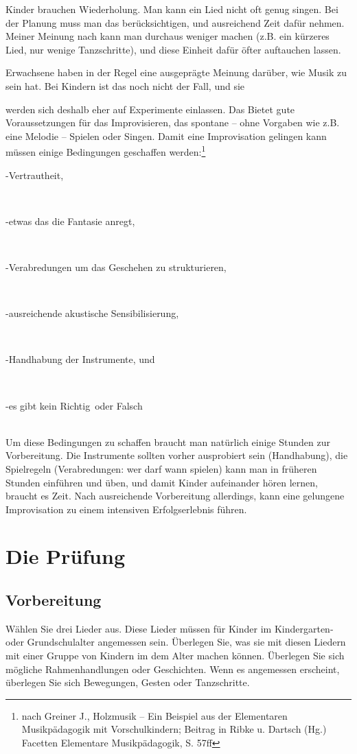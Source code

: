 \documentclass[10pt,a4paper,twoside]{report}
\newcommand{\comment}[1]{
	\marginpar{
		\textsf{#1}
	}
}
\newcommand{\myquote}[1]{
	\hspace{15mm}
	\parbox{100mm}{
		#1
	}
	\ \\
}
\begin{document}
Kinder brauchen Wiederholung.\comment{Wiederholung} Man kann ein Lied nicht oft
genug singen. 
Bei der Planung muss man das berücksichtigen, und ausreichend Zeit dafür nehmen.
Meiner Meinung nach kann man durchaus weniger machen (z.B. ein kürzeres Lied, 
nur wenige Tanzschritte), und diese Einheit dafür öfter auftauchen lassen.

Erwachsene haben in der Regel eine ausgeprägte Meinung darüber, wie
Musik zu sein hat. Bei Kindern ist das noch nicht der Fall, und sie\comment{Experimente} 
werden sich deshalb eher auf Experimente einlassen. Das Bietet gute 
Voraussetzungen für das Improvisieren, \comment{Improvisation} das spontane
-- ohne Vorgaben wie z.B. eine Melodie -- Spielen oder Singen.
Damit eine Improvisation gelingen kann müssen einige Bedingungen geschaffen 
werden:\footnote{nach Greiner J., \glqq Holzmusik -- Ein Beispiel aus der Elementaren
	Musikpädagogik mit Vorschulkindern\grqq; Beitrag in Ribke u. Dartsch (Hg.) Facetten
	Elementare Musikpädagogik, S. 57ff}

\myquote{-Vertrautheit,}

\myquote{-etwas das die Fantasie anregt,}

\myquote{-Verabredungen um das Geschehen zu strukturieren,}

\myquote{-ausreichende akustische Sensibilisierung,}

\myquote{-Handhabung der Instrumente, und}

\myquote{-es gibt kein \glqq Richtig\grqq\ oder \glqq Falsch\grqq\ }

Um diese Bedingungen zu schaffen braucht man natürlich einige Stunden zur Vorbereitung.
Die Instrumente sollten vorher ausprobiert sein (Handhabung), die Spielregeln
(Verabredungen: wer darf wann spielen) kann man in früheren Stunden einführen
und üben, und damit Kinder aufeinander hören lernen, braucht es Zeit. Nach
ausreichende Vorbereitung allerdings, kann eine gelungene Improvisation zu 
einem intensiven Erfolgserlebnis führen.

\chapter{Die Prüfung}
\section{Vorbereitung}
Wählen Sie drei Lieder aus. Diese Lieder müssen für Kinder im 
Kindergarten- oder Grundschulalter angemessen sein. Überlegen Sie, was sie mit diesen Liedern
mit einer Gruppe von Kindern im dem Alter machen können. Überlegen Sie
sich mögliche Rahmenhandlungen oder Geschichten. Wenn es angemessen 
erscheint, überlegen Sie sich Bewegungen, Gesten oder Tanzschritte.
\end{document}
